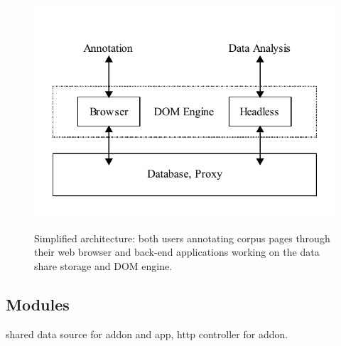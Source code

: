 \begin{figure}
	{\includegraphics[width=\textwidth]{arch}}
\caption{\label{f:arch}Simplified \KrdWrd architecture: both users annotating corpus pages through their web browser
and back-end applications working on the data share storage and DOM engine.}
\end{figure}


\subsection{Modules}

shared data source for addon and app, http controller for addon.
